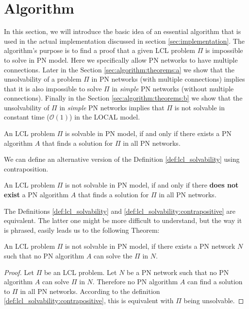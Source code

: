 
\section{Algorithm} \label{sec:algorithm}

In this section, we will introduce the basic idea of an essential algorithm that is used in the actual implementation discussed in section \ref{sec:implementation}.
The algorithm's purpose is to find a proof that a given LCL problem $\Pi$ is impossible to solve in PN model.
Here we specifically allow PN networks to have multiple connections.
Later in the Section \ref{sec:algorithm:theorems:a} we show that the unsolvability of a problem $\Pi$ in PN networks (with multiple connections) implies that it is also impossible to solve $\Pi$ in \emph{simple} PN networks (without multiple connections).
Finally in the Section \ref{sec:algorithm:theorems:b} we show that the unsolvability of $\Pi$ in \emph{simple} PN networks implies that $\Pi$ is not solvable in constant time ($\mathcal{O}(1)$) in the LOCAL model.

\begin{definition} \label{def:lcl_solvability}
    An LCL problem $\Pi$ is solvable in PN model, if and only if there exists a PN algorithm $A$ that finds a solution for $\Pi$ in all PN networks.
\end{definition}

We can define an alternative version of the Definition \ref{def:lcl_solvability} using contraposition.
\begin{definition} \label{def:lcl_solvability:contrapositive}
An LCL problem $\Pi$ is not solvable in PN model, if and only if there \textbf{does not exist} a PN algorithm $A$ that finds a solution for $\Pi$ in all PN networks.
\end{definition}

The Definitions \ref{def:lcl_solvability} and \ref{def:lcl_solvability:contrapositive} are equivalent. The latter one might be more difficult to understand, but the way it is phrased, easily leads us to the following Theorem:

\begin{theorem} \label{thm:lcl_nonsolvability}
    An LCL problem $\Pi$ is not solvable in PN model, if there exists a PN network $N$ such that no PN algorithm $A$ can solve the $\Pi$ in $N$.
\end{theorem}
\begin{proof}
    Let $\Pi$ be an LCL problem.
    Let $N$ be a PN network such that no PN algorithm $A$ can solve $\Pi$ in $N$.
    Therefore no PN algorithm $A$ can find a solution to $\Pi$ in all PN networks.
    According to the definition \ref{def:lcl_solvability:contrapositive}, this is equivalent with $\Pi$ being unsolvable.
\end{proof}

